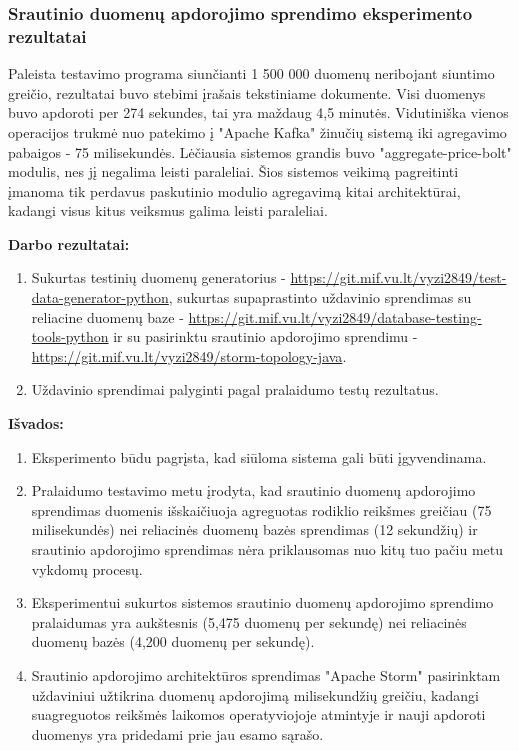 \documentclass{VUMIFPSkursinis}
\begin{document}
\subsubsection{Srautinio duomenų apdorojimo sprendimo eksperimento rezultatai}
Paleista testavimo programa siunčianti 1 500 000 duomenų neribojant siuntimo greičio, rezultatai buvo stebimi įrašais tekstiniame dokumente.
Visi duomenys buvo apdoroti per 274 sekundes, tai yra maždaug 4,5 minutės. Vidutiniška vienos operacijos trukmė nuo 
patekimo į "Apache Kafka" žinučių sistemą iki agregavimo pabaigos - 75 milisekundės.
Lėčiausia sistemos grandis buvo "aggregate-price-bolt" modulis, nes jį negalima leisti paraleliai. Šios sistemos veikimą pagreitinti 
įmanoma tik perdavus paskutinio modulio agregavimą kitai architektūrai, kadangi visus kitus veiksmus galima leisti paraleliai.


\textbf{Darbo rezultatai:}
\vspace{1 mm}

    \begin{enumerate}
        \item Sukurtas testinių duomenų generatorius - \url{https://git.mif.vu.lt/vyzi2849/test-data-generator-python}, 
        sukurtas supaprastinto uždavinio sprendimas su reliacine duomenų baze - \url{https://git.mif.vu.lt/vyzi2849/database-testing-tools-python}
         ir su pasirinktu srautinio apdorojimo sprendimu - \url{https://git.mif.vu.lt/vyzi2849/storm-topology-java}.
        \item Uždavinio sprendimai palyginti pagal pralaidumo testų rezultatus.
    \end{enumerate}
    \vspace{1 mm}

\textbf{Išvados:}
\vspace{1 mm}

    \begin{enumerate}
    \item Eksperimento būdu pagrįsta, kad siūloma sistema gali būti įgyvendinama.
    \item Pralaidumo testavimo metu įrodyta, kad srautinio duomenų apdorojimo sprendimas duomenis išskaičiuoja 
    agreguotas rodiklio reikšmes greičiau (75 milisekundės) nei reliacinės duomenų bazės sprendimas (12 sekundžių) 
    ir srautinio apdorojimo sprendimas nėra priklausomas nuo kitų tuo pačiu metu vykdomų procesų.
    \item Eksperimentui sukurtos sistemos srautinio duomenų apdorojimo sprendimo pralaidumas yra aukštesnis 
    (5,475 duomenų per sekundę) nei reliacinės duomenų bazės (4,200 duomenų per sekundę). 
    \item Srautinio apdorojimo architektūros sprendimas "Apache Storm" pasirinktam uždaviniui užtikrina duomenų apdorojimą milisekundžių greičiu,
    kadangi suagreguotos reikšmės laikomos operatyviojoje atmintyje ir nauji apdoroti duomenys yra pridedami prie jau esamo sąrašo.

    \end{enumerate}

\printbibliography[heading=bibintoc] 
\end{document}
